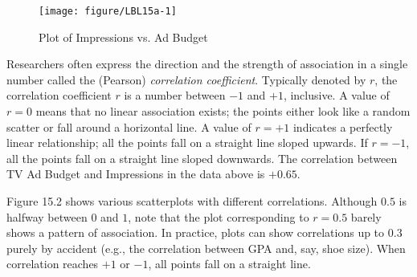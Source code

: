 \documentclass[11pt]{book}\usepackage[]{graphicx}\usepackage[]{color}
\begin{document}
\begin{figure}[ht]

\centering
\caption{Plot of Impressions vs. Ad Budget}




{\centering \texttt{[image: figure/LBL15a-1]} 

}




\end{figure}

Researchers often express the direction and the strength of association in a single number called the (Pearson) \textit{correlation coefficient}.  Typically denoted by $r$, the correlation coefficient $r$ is a number between $-1$ and $+1$, inclusive.  A value of $r = 0$ means that no linear association exists; the points either look like a random scatter or fall around a horizontal line.  A value of $r = +1$ indicates a perfectly linear relationship; all the points fall on a straight line sloped upwards.  If $r = -1$, all the points fall on a straight line sloped downwards. The correlation between TV Ad Budget and Impressions in the data above is $+0.65$.

Figure 15.2 shows various scatterplots with different correlations.  Although $0.5$ is \\ halfway between $0$ and $1$, note that the plot corresponding to $r = 0.5$ barely shows a pattern of association.  In practice, plots can show correlations up to $0.3$ purely by accident (e.g., the correlation between GPA and, say, shoe size).  When correlation reaches $+1$ or $-1$, all points fall on a straight line.

\end{document}
